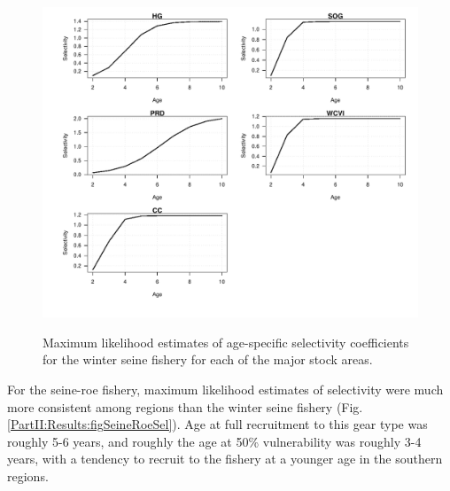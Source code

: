 \begin{figure}[!tbp]
	\includegraphics[width=\textwidth]{../FIGS/qPriorFigs/iscam_fig_sel2d_winter_seine_sel.pdf}\\
	\caption{Maximum likelihood estimates of age-specific selectivity coefficients for the winter seine fishery for each of the major stock areas.}\label{PartII:Results:figWinterSeineSel}
\end{figure}

For the seine-roe fishery, maximum likelihood estimates of selectivity were much more consistent among regions than the winter seine fishery (Fig. \ref{PartII:Results:figSeineRoeSel}).  Age at full recruitment to this gear type was roughly 5-6 years, and roughly the age at 50\% vulnerability was roughly 3-4 years, with a tendency to recruit to the fishery at a younger age in the southern regions.

